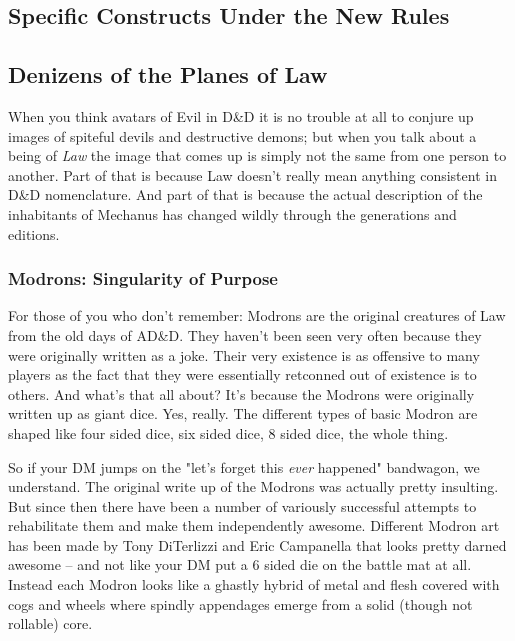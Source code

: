 \subsection{Specific Constructs Under the New Rules}



\subsection{Denizens of the Planes of Law}

When you think avatars of Evil in D\&D it is no trouble at all to conjure up images of spiteful devils and destructive demons; but when you talk about a being of \textit{Law} the image that comes up is simply not the same from one person to another. Part of that is because Law doesn't really mean anything consistent in D\&D nomenclature. And part of that is because the actual description of the inhabitants of Mechanus has changed wildly through the generations and editions.

\subsubsection{Modrons: Singularity of Purpose}

For those of you who don't remember: Modrons are the original creatures of Law from the old days of AD\&D. They haven't been seen very often because they were originally written as a joke. Their very existence is as offensive to many players as the fact that they were essentially retconned out of existence is to others. And what's that all about? It's because the Modrons were originally written up as giant dice. Yes, really. The different types of basic Modron are shaped like four sided dice, six sided dice, 8 sided dice, the whole thing.

So if your DM jumps on the "let's forget this \textit{ever} happened" bandwagon, we understand. The original write up of the Modrons was actually pretty insulting. But since then there have been a number of variously successful attempts to rehabilitate them and make them independently awesome. Different Modron art has been made by Tony DiTerlizzi and Eric Campanella that looks pretty darned awesome -- and not like your DM put a 6 sided die on the battle mat at all. Instead each Modron looks like a ghastly hybrid of metal and flesh covered with cogs and wheels where spindly appendages emerge from a solid (though not rollable) core.

